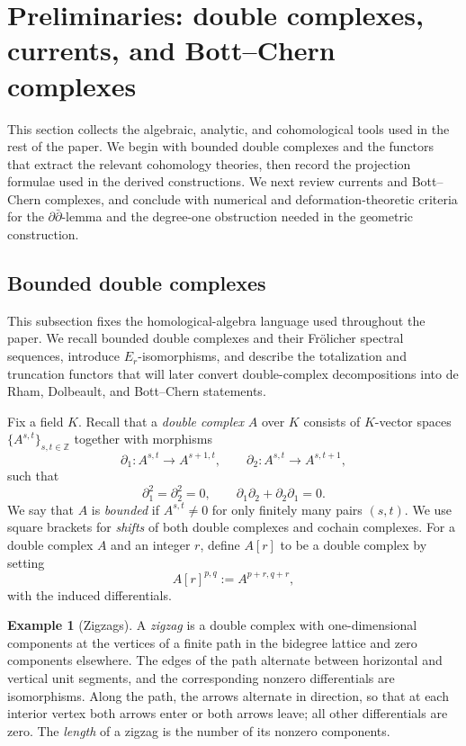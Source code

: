 \documentclass[11pt]{amsart}
\numberwithin{equation}{section}
\theoremstyle{plain}
\theoremstyle{definition}
\newtheorem{Ex}[thm]{Example}
\begin{document}
\section{Preliminaries: double complexes, currents, and Bott--Chern complexes}
\label{preliminaries}

This section collects the algebraic, analytic, and cohomological tools used
in the rest of the paper.  We begin with bounded double complexes and the
functors that extract the relevant cohomology theories, then record the
projection formulae used in the derived constructions.  We next review
currents and Bott--Chern complexes, and conclude with numerical and
deformation-theoretic criteria for the $\partial\bar\partial$-lemma and the
degree-one obstruction needed in the geometric construction.

\subsection{Bounded double complexes}

This subsection fixes the homological-algebra language used throughout the
paper.  We recall bounded double complexes and their Fr\"olicher spectral
sequences, introduce $E_r$-isomorphisms, and describe the totalization and
truncation functors that will later convert double-complex decompositions
into de Rham, Dolbeault, and Bott--Chern statements.

Fix a field $K$.  Recall that a \emph{double complex} $A$ over $K$ consists of
$K$-vector spaces $\{A^{s,t}\}_{s,t\in\mathbb Z}$ together with morphisms
\[
\partial_1:A^{s,t}\longrightarrow A^{s+1,t},
\qquad
\partial_2:A^{s,t}\longrightarrow A^{s,t+1},
\]
such that
\[
\partial_1^2=\partial_2^2=0,
\qquad
\partial_1\partial_2+\partial_2\partial_1=0.
\]
We say that $A$ is \emph{bounded} if $A^{s,t}\neq0$ for only finitely many pairs
$(s,t)$.
We use square brackets for \emph{shifts} of both double complexes and
cochain complexes. For a double complex $A$ and an integer $r$, define $A[r]$ to be a double complex by setting
\[
A[r]^{p,q}:=A^{p+r,q+r},
\]
with the induced differentials.

\begin{Ex}[Zigzags]\label{ex-zigzag}\normalfont
A \emph{zigzag} is a double complex with one-dimensional components at the
vertices of a finite path in the bidegree lattice and zero components
elsewhere. The edges of the path alternate between horizontal and vertical
unit segments, and the corresponding nonzero differentials are
isomorphisms. Along the path, the arrows alternate in direction, so that
at each interior vertex both arrows enter or both arrows leave; all other
differentials are zero. The \emph{length} of a zigzag is the number of its
nonzero components.
\end{Ex}
\end{document}
